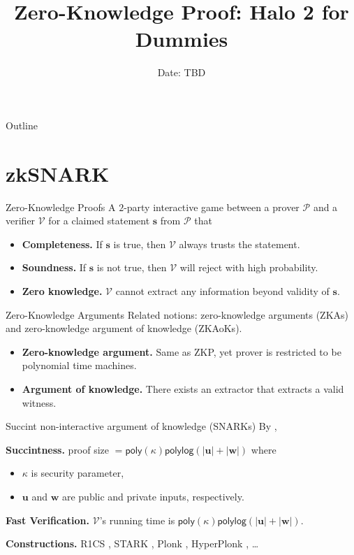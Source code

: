 \documentclass{beamer}
\title{Zero-Knowledge Proof: Halo 2 for Dummies}
\date{Date: TBD}
\newcommand{\prover}{\mathcal{P}}
\newcommand{\verifier}{\mathcal{V}}
\newcommand{\poly}{\mathsf{poly}}
\newcommand{\polylog}{\mathsf{polylog}}
\begin{document}
	\begin{frame}
		\titlepage
	\end{frame}
	
	\begin{frame}{Outline}
		\tableofcontents
	\end{frame}
	\section{zkSNARK}
	\begin{frame}{Zero-Knowledge Proofs}
		A $2$-party interactive game between a prover $\prover$ and a verifier $\verifier$ for a claimed statement $\mathbf{s}$ from $\prover$ that 
		\begin{itemize}
			\item \textbf{Completeness.} If $\mathbf{s}$ is true, then $\verifier$ always trusts the statement. 
			\item \textbf{Soundness.} If $\mathbf{s}$ is not true, then $\verifier$ will reject with high probability. 
			\item \textbf{Zero knowledge.} $\verifier$ cannot extract any information beyond validity of $\mathbf{s}$. 
		\end{itemize}
	\end{frame}
	
	\begin{frame}{Zero-Knowledge Arguments}
		Related notions: zero-knowledge arguments (ZKAs) and zero-knowledge argument of knowledge (ZKAoKs).
		\begin{itemize}
			\item \textbf{Zero-knowledge argument.} Same as ZKP, yet prover is restricted to be polynomial time machines.
			\item \textbf{Argument of knowledge.} There exists an extractor that extracts a valid witness.
		\end{itemize}
	\end{frame}
	
	\begin{frame}{Succint non-interactive argument of knowledge (SNARKs)}
		By \cite{eurocrypt/GennaroGP013},
		
		\textbf{Succintness.} proof size $= \poly(\kappa)\polylog(|\mathbf{u}| + |\mathbf{w}|)$ where 
		\begin{itemize}
			\item $\kappa$ is security parameter, 
			\item $\mathbf{u}$ and $\mathbf{w}$ are public and private inputs, respectively. 
		\end{itemize}
		
		\textbf{Fast Verification.} $\verifier$'s running time is $\poly(\kappa)\polylog(|\mathbf{u}| + |\mathbf{w}|)$.
		
		\textbf{Constructions.} R1CS \cite{eurocrypt/Groth16}, STARK \cite{iacr/Ben-SassonBHR18}, Plonk \cite{iacr/GabizonWC19}, HyperPlonk \cite{iacr/ChenBBZ22}, \dots
	\end{frame}
\end{document}
